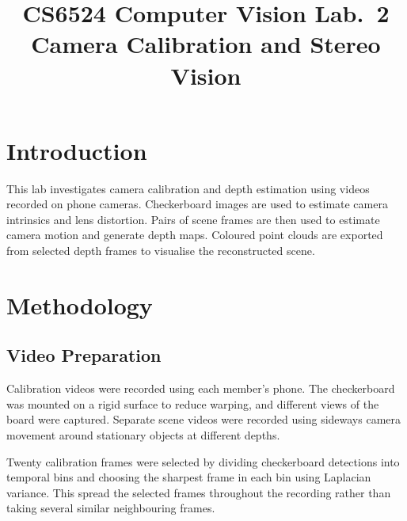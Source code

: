 \documentclass[conference]{assets/latex/IEEEtran}
\begin{document}
\title{CS6524 Computer Vision Lab.~2\\
Camera Calibration and Stereo Vision}

\author{
\and
{}
\and
{}
}

\maketitle

\section{Introduction}

This lab investigates camera calibration and depth estimation
using videos recorded on phone cameras. Checkerboard images
are used to estimate camera intrinsics and lens distortion.
Pairs of scene frames are then used to estimate camera motion
and generate depth maps. Coloured point clouds are exported
from selected depth frames to visualise the reconstructed scene.


\section{Methodology}

\subsection{Video Preparation}

Calibration videos were recorded using each member's phone.
The checkerboard was mounted on a rigid surface to reduce
warping, and different views of the board were captured.
Separate scene videos were recorded using sideways camera
movement around stationary objects at different depths.

Twenty calibration frames were selected by dividing
checkerboard detections into temporal bins and choosing
the sharpest frame in each bin using Laplacian variance.
This spread the selected frames throughout the recording
rather than taking several similar neighbouring frames.
\end{document}
